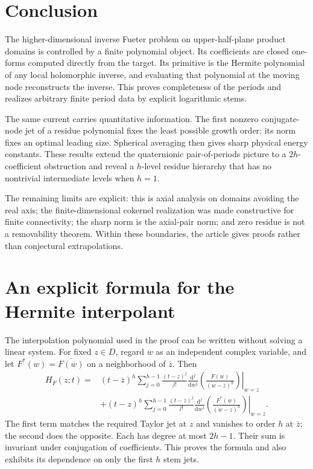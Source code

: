 \documentclass[11pt,a4paper]{article}
\numberwithin{equation}{section}
\theoremstyle{definition}
\theoremstyle{remark}
\newcommand{\barz}{\overline z}
\begin{document}
\section{Conclusion}

The higher-dimensional inverse Fueter problem on upper-half-plane product
domains is controlled by a finite polynomial object. Its coefficients are
closed one-forms computed directly from the target. Its primitive is the
Hermite polynomial of any local holomorphic inverse, and evaluating that
polynomial at the moving node reconstructs the inverse. This proves
completeness of the periods and realizes arbitrary finite period data by
explicit logarithmic stems.

The same current carries quantitative information. The first nonzero
conjugate-node jet of a residue polynomial fixes the least possible growth
order; its norm fixes an optimal leading size. Spherical averaging then gives
sharp physical energy constants. These results extend the quaternionic
pair-of-periods picture to a $2h$-coefficient obstruction and reveal a
$h$-level residue hierarchy that has no nontrivial intermediate levels when
$h=1$.

The remaining limits are explicit: this is axial analysis on domains avoiding
the real axis; the finite-dimensional cokernel realization was made
constructive for finite connectivity; the sharp norm is the axial-pair norm;
and zero residue is not a removability theorem. Within these boundaries, the
article gives proofs rather than conjectural extrapolations.

\appendix
\section{An explicit formula for the Hermite interpolant}
\label{app:hermite}

The interpolation polynomial used in the proof can be written without solving
a linear system. For fixed $z\in D$, regard $w$ as an independent complex
variable, and let $F^*(w)=\overline{F(\overline w)}$ on a neighborhood of
$\barz$. Then
\begin{equation}\label{eq:explicit-hermite}
\begin{split}
 H_F(z;t)={}&(t-\barz)^h\sum_{j=0}^{h-1}
 \frac{(t-z)^j}{j!}
 \left.\frac{\mathrm d^j}{\mathrm dw^j}
       \left(\frac{F(w)}{(w-\barz)^h}\right)\right|_{w=z}\\
 &+(t-z)^h\sum_{j=0}^{h-1}
 \frac{(t-\barz)^j}{j!}
 \left.\frac{\mathrm d^j}{\mathrm dw^j}
       \left(\frac{F^*(w)}{(w-z)^h}\right)\right|_{w=\barz}.
\end{split}
\end{equation}
The first term matches the required Taylor jet at $z$ and vanishes to order
$h$ at $\barz$; the second does the opposite. Each has degree at most $2h-1$.
Their sum is invariant under conjugation of coefficients. This proves the
formula and also exhibits its dependence on only the first $h$ stem jets.
\end{document}

